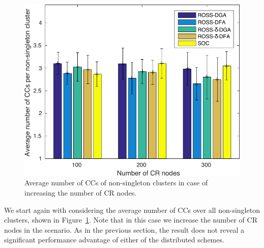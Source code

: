\documentclass[times]{ettauth}
\theoremstyle{mytheoremstyle}
\theoremstyle{mytheoremstyle}
\theoremstyle{mytheoremstyle}
\begin{document}
\begin{figure}[ht!]
  \centering
  \includegraphics[width=.7\linewidth]{ccc_large_scale_color_082017_newdata_no_texture.pdf}
  \caption{Average number of CCs of non-singleton clusters in case of increasing the number of CR nodes.}
  \label{ccc_large_scale}
\end{figure}
We start again with considering the average number of CCs over all non-singleton clusters, shown in Figure~\ref{ccc_large_scale}.
Note that in this case we increase the number of CR nodes in the scenario.
As in the previous section, the result does not reveal a significant performance advantage of either of the distributed schemes.
\end{document}
